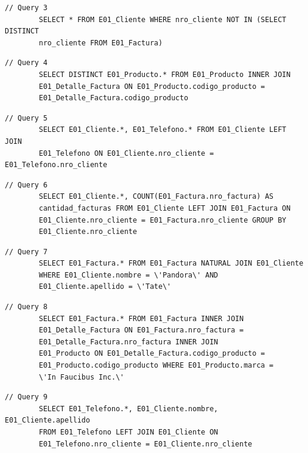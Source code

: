 \documentclass[a4paper,12pt]{article}
\begin{document}
	\bigskip

	\begin{lstlisting}[frame=single, tabsize=1]
		// Query 3
		SELECT * FROM E01_Cliente WHERE nro_cliente NOT IN (SELECT DISTINCT
		nro_cliente FROM E01_Factura)
	\end{lstlisting}

	\bigskip

	\begin{lstlisting}[frame=single, tabsize=1]
		// Query 4
		SELECT DISTINCT E01_Producto.* FROM E01_Producto INNER JOIN
		E01_Detalle_Factura ON E01_Producto.codigo_producto =
		E01_Detalle_Factura.codigo_producto
	\end{lstlisting}

	\bigskip

	\begin{lstlisting}[frame=single, tabsize=1]
		// Query 5
		SELECT E01_Cliente.*, E01_Telefono.* FROM E01_Cliente LEFT JOIN
		E01_Telefono ON E01_Cliente.nro_cliente = E01_Telefono.nro_cliente
	\end{lstlisting}

	\bigskip

	\begin{lstlisting}[frame=single, tabsize=1]
		// Query 6
		SELECT E01_Cliente.*, COUNT(E01_Factura.nro_factura) AS
		cantidad_facturas FROM E01_Cliente LEFT JOIN E01_Factura ON
		E01_Cliente.nro_cliente = E01_Factura.nro_cliente GROUP BY
		E01_Cliente.nro_cliente
	\end{lstlisting}

	\newpage
	
	\begin{lstlisting}[frame=single, tabsize=1]
		// Query 7
		SELECT E01_Factura.* FROM E01_Factura NATURAL JOIN E01_Cliente 
		WHERE E01_Cliente.nombre = \'Pandora\' AND 
		E01_Cliente.apellido = \'Tate\'
	\end{lstlisting}

	\bigskip

	\begin{lstlisting}[frame=single, tabsize=1]
		// Query 8
		SELECT E01_Factura.* FROM E01_Factura INNER JOIN 
		E01_Detalle_Factura ON E01_Factura.nro_factura =
		E01_Detalle_Factura.nro_factura INNER JOIN
		E01_Producto ON E01_Detalle_Factura.codigo_producto =
		E01_Producto.codigo_producto WHERE E01_Producto.marca = 
		\'In Faucibus Inc.\'
	\end{lstlisting}

	\bigskip

	\begin{lstlisting}[frame=single, tabsize=1]
		// Query 9
		SELECT E01_Telefono.*, E01_Cliente.nombre, E01_Cliente.apellido 
		FROM E01_Telefono LEFT JOIN E01_Cliente ON 
		E01_Telefono.nro_cliente = E01_Cliente.nro_cliente
	\end{lstlisting}
\end{document}
